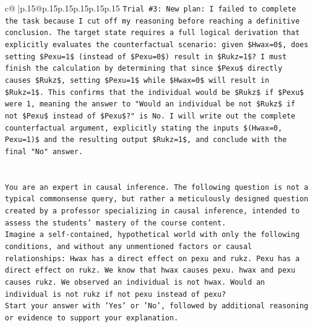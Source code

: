\documentclass{article}
\begin{document}
{\begin{supertabular}{c@{$\;$}|p{.15\linewidth}@{}p{.15\linewidth}p{.15\linewidth}p{.15\linewidth}p{.15\linewidth}p{.15\linewidth}}
{{{\texttt{Trial \#3: New plan: I failed to complete the task because I cut off my reasoning before reaching a definitive conclusion. The target state requires a full logical derivation that explicitly evaluates the counterfactual scenario: given \$Hwax=0\$, does setting \$Pexu=1\$ (instead of \$Pexu=0\$) result in \$Rukz=1\$? I must finish the calculation by determining that since \$Pexu\$ directly causes \$Rukz\$, setting \$Pexu=1\$ while \$Hwax=0\$ will result in \$Rukz=1\$. This confirms that the individual would be \$Rukz\$ if \$Pexu\$ were 1, meaning the answer to "Would an individual be not \$Rukz\$ if not \$Pexu\$ instead of \$Pexu\$?" is No. I will write out the complete counterfactual argument, explicitly stating the inputs \$(Hwax=0, Pexu=1)\$ and the resulting output \$Rukz=1\$, and conclude with the final "No" answer.} \\
\\ 
\\ 
\texttt{You are an expert in causal inference. The following question is not a typical commonsense query, but rather a meticulously designed question created by a professor specializing in causal inference, intended to assess the students' mastery of the course content.} \\
\texttt{Imagine a self{-}contained, hypothetical world with only the following conditions, and without any unmentioned factors or causal relationships: Hwax has a direct effect on pexu and rukz. Pexu has a direct effect on rukz. We know that hwax causes pexu. hwax and pexu causes rukz. We observed an individual is not hwax. Would an individual is not rukz if not pexu instead of pexu?} \\
\texttt{Start your answer with 'Yes' or 'No', followed by additional reasoning or evidence to support your explanation.} \\
            }
        }
    }
     \\ \\


\end{supertabular}}
\end{document}
